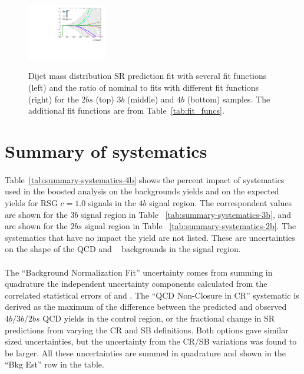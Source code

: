 \begin{figure}[htbp!]
\begin{center}
\includegraphics[width=0.31\textwidth,angle=-90]{figures/boosted/Syst_Smooth/smoothFuncCompare_44_comp_ratio.pdf} \\
\caption{ Dijet mass distribution SR prediction fit with several fit functions (left) and the ratio of nominal to fits with different fit functions (right)  for the $2bs$ (top) $3b$ (middle) and $4b$ (bottom) samples. The additional fit functions are from Table~\ref{tab:fit_funcs}.}
\label{fig:qcd_fit_funcs_sys}
\end{center}
\end{figure}


\section{Summary of systematics}
\label{sec:boosted-systematics-numbers}

\paragraph{}
Table~\ref{tab:summary-systematics-4b} shows the percent impact of systematics used in the boosted analysis on the backgrounds yields and on the expected yields for RSG $c=1.0$ signals in the $4b$ signal region.
The correspondent values are shown for the $3b$ signal region in Table ~\ref{tab:summary-systematics-3b}, and are shown for the $2bs$ signal region in Table ~\ref{tab:summary-systematics-2b}.
The systematics that have no impact the yield are not listed. 
These are uncertainties on the shape of the QCD and \ttbar~ backgrounds in the signal region.

\paragraph{}
The ``Background Normalization Fit'' uncertainty comes from summing in quadrature the independent uncertainty components calculated from the correlated statistical errors of \muqcd and \alphatt. 
The ``QCD Non-Closure in CR'' systematic is derived as the maximum of the difference between the predicted and observed $4b/3b/2bs$ QCD yields in the control region, or the fractional change in SR predictions from varying the CR and SB definitions.
Both options gave similar sized uncertainties, but the uncertainty from the CR/SB variations was found to be larger. 
All these uncertainties are summed in quadrature and shown in the ``Bkg Est'' row in the table.

